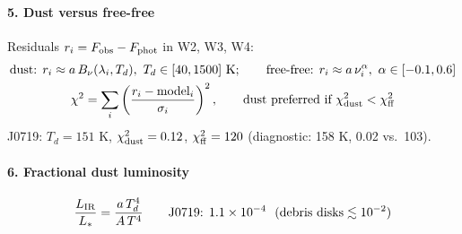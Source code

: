 \documentclass[11pt]{article}
\begin{document}
\paragraph{5. Dust versus free-free} Residuals $r_i = F_{\rm obs} - F_{\rm phot}$ in W2, W3, W4:
\begin{gather}
\text{dust: } r_i \approx a\,B_\nu(\lambda_i, T_d),\ T_d \in [40,1500]\ \text{K}; \qquad
\text{free-free: } r_i \approx a\,\nu_i^{\alpha},\ \alpha \in [-0.1, 0.6] \\
\chi^2 = \sum_i \left(\frac{r_i - \text{model}_i}{\sigma_i}\right)^2, \qquad \text{dust preferred if } \chi^2_{\rm dust} < \chi^2_{\rm ff}
\end{gather}
J0719: $T_d = 151$ K, $\chi^2_{\rm dust} = 0.12$, $\chi^2_{\rm ff} = 120$ (diagnostic: 158 K, 0.02 vs.\ 103).

\paragraph{6. Fractional dust luminosity}
\begin{equation}
\frac{L_{\rm IR}}{L_\ast} = \frac{a\,T_d^{4}}{A\,T^{4}} \qquad \text{J0719: } 1.1\times10^{-4}\ \ (\text{debris disks} \lesssim 10^{-2})
\end{equation}
\end{document}
